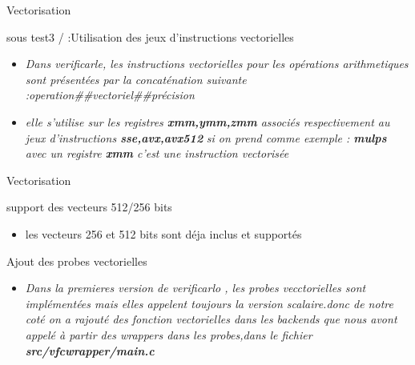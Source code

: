 \documentclass{beamer}
\begin{document}
\begin{frame}{Vectorisation}   

\begin{block}{sous test3 / :Utilisation des jeux d’instructions vectorielles}
     \begin{itemize}
     \item\textit{Dans verificarle, les instructions vectorielles pour les opérations arithmetiques sont présentées par la concaténation suivante :operation##vectoriel##précision } 
      \item\textit{elle s'utilise sur les registres \textbf{xmm,ymm,zmm } associés respectivement au jeux d'instructions \textbf{sse,avx,avx512} } 
      \textit{si on prend comme exemple : \textbf{mulps} avec un registre \textbf{xmm} c'est une instruction vectorisée} 
   \end{itemize}
  \end{block}
 \end{frame}

\begin{frame}{Vectorisation}         
\begin{block}{support des vecteurs 512/256 bits}
     \begin{itemize}
         \item les vecteurs 256 et 512 bits sont déja inclus et supportés
     \end{itemize}
     
\end{block}
\begin{block}{Ajout des probes vectorielles}
    \begin{itemize}
    \item\textit{Dans la premieres version de verificarlo , les probes vecctorielles sont implémentées mais elles appelent toujours la version scalaire.donc de notre coté on a rajouté des fonction vectorielles dans les backends que nous avont appelé à partir des wrappers dans les probes,dans le fichier \textbf{src/vfcwrapper/main.c} } 
   \end{itemize}  
\end{block}
 \end{frame}
\end{document}
